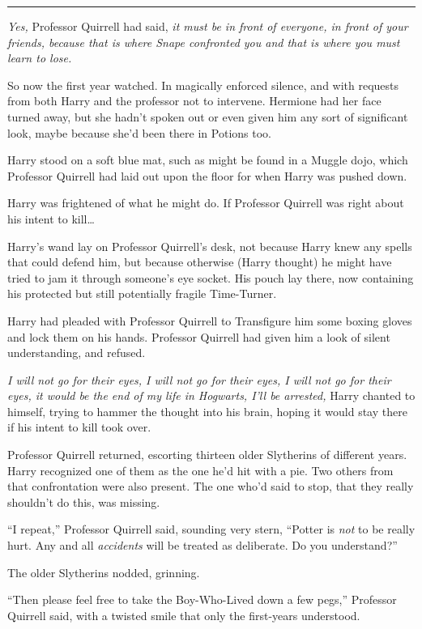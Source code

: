\begin{center}\rule{3in}{0.4pt}\end{center}

\emph{Yes,} Professor Quirrell had said, \emph{it must be in front of
everyone, in front of your friends, because that is where Snape
confronted you and that is where you must learn to lose.}

So now the first year watched. In magically enforced silence, and with
requests from both Harry and the professor not to intervene. Hermione
had her face turned away, but she hadn't spoken out or even given him
any sort of significant look, maybe because she'd been there in Potions
too.

Harry stood on a soft blue mat, such as might be found in a Muggle dojo,
which Professor Quirrell had laid out upon the floor for when Harry was
pushed down.

Harry was frightened of what he might do. If Professor Quirrell was
right about his intent to kill\ldots{}

Harry's wand lay on Professor Quirrell's desk, not because Harry knew
any spells that could defend him, but because otherwise (Harry thought)
he might have tried to jam it through someone's eye socket. His pouch
lay there, now containing his protected but still potentially fragile
Time-Turner.

Harry had pleaded with Professor Quirrell to Transfigure him some boxing
gloves and lock them on his hands. Professor Quirrell had given him a
look of silent understanding, and refused.

\emph{I will not go for their eyes, I will not go for their eyes, I will
not go for their eyes, it would be the end of my life in Hogwarts, I'll
be arrested,} Harry chanted to himself, trying to hammer the thought
into his brain, hoping it would stay there if his intent to kill took
over.

Professor Quirrell returned, escorting thirteen older Slytherins of
different years. Harry recognized one of them as the one he'd hit with a
pie. Two others from that confrontation were also present. The one who'd
said to stop, that they really shouldn't do this, was missing.

``I repeat,'' Professor Quirrell said, sounding very stern, ``Potter is
\emph{not} to be really hurt. Any and all \emph{accidents} will be
treated as deliberate. Do you understand?''

The older Slytherins nodded, grinning.

``Then please feel free to take the Boy-Who-Lived down a few pegs,''
Professor Quirrell said, with a twisted smile that only the first-years
understood.

